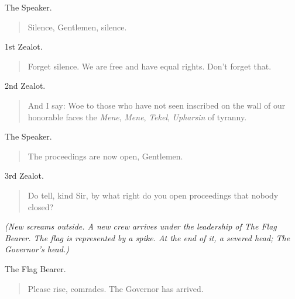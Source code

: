 \documentclass[letterpaper,article,12pt,oneside,notitlepage]{memoir}
\begin{document}
\begin{center}The Speaker.\end{center}

\begin{verse}
Silence, Gentlemen, silence. \\
\end{verse}

\begin{center}1st Zealot.\end{center}

\begin{verse}
\indent Forget silence. We are free and have equal rights. Don't forget that. \\
\end{verse}

\begin{center}2nd Zealot.\end{center}

\begin{verse}
\indent And I say: Woe to those who have not seen inscribed on the wall of our honorable faces the \textit{Mene}, \textit{Mene}, \textit{Tekel}, \textit{Upharsin} of tyranny. \\
\end{verse}

\begin{center}The Speaker.\end{center}

\begin{verse}
\hspace{1cm} The proceedings are now open, Gentlemen. \\
\end{verse}

\begin{center}3rd Zealot.\end{center}

\begin{verse}
\indent Do tell, kind Sir, by what right do you open proceedings that nobody closed? \\
\end{verse}

\textit{(New screams outside. A new crew arrives under the leadership of The Flag Bearer. The flag is represented by a spike. At the end of it, a severed head; The Governor's head.)}

\begin{center}The Flag Bearer.\end{center}

\begin{verse}
\hspace{1cm} Please rise, comrades. The Governor has arrived. \\
\end{verse}
\end{document}
